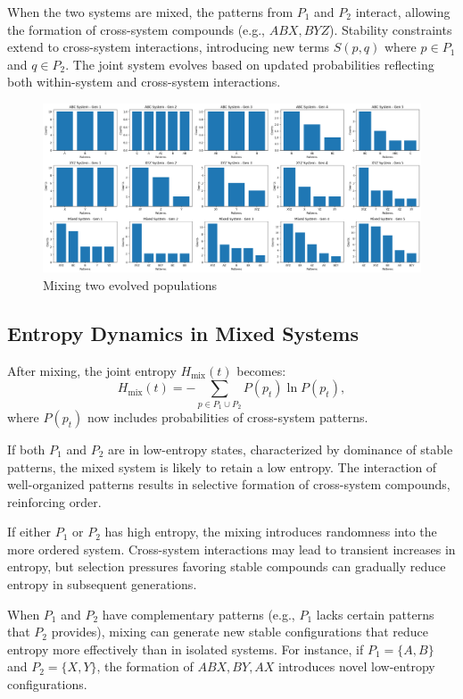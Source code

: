 \documentclass[entropy,article,submit,pdftex,moreauthors]{Definitions/mdpi}
\begin{document}
When the two systems are mixed, the patterns from \( P_1 \) and \( P_2 \) interact, allowing the formation of cross-system compounds (e.g., \( ABX, BYZ \)). Stability constraints extend to cross-system interactions, introducing new terms \( S(p, q) \) where \( p \in P_1 \) and \( q \in P_2 \). The joint system evolves based on updated probabilities reflecting both within-system and cross-system interactions.

\begin{figure}[htp]
    \centering
    \includegraphics[width=13cm]{mixed_1}
    \caption{Mixing two evolved populations}
    \label{fig:mixed_1}
\end{figure}

\subsection{Entropy Dynamics in Mixed Systems}

After mixing, the joint entropy \( H_{\text{mix}}(t) \) becomes:
\[
H_{\text{mix}}(t) = -\sum_{p \in P_1 \cup P_2} P(p_t) \ln P(p_t),
\]
where \( P(p_t) \) now includes probabilities of cross-system patterns.

If both \( P_1 \) and \( P_2 \) are in low-entropy states, characterized by dominance of stable patterns, the mixed system is likely to retain a low entropy. The interaction of well-organized patterns results in selective formation of cross-system compounds, reinforcing order.

If either \( P_1 \) or \( P_2 \) has high entropy, the mixing introduces randomness into the more ordered system. Cross-system interactions may lead to transient increases in entropy, but selection pressures favoring stable compounds can gradually reduce entropy in subsequent generations.

When \( P_1 \) and \( P_2 \) have complementary patterns (e.g., \( P_1 \) lacks certain patterns that \( P_2 \) provides), mixing can generate new stable configurations that reduce entropy more effectively than in isolated systems. For instance, if \( P_1 = \{A, B\} \) and \( P_2 = \{X, Y\} \), the formation of \( ABX, BY, AX \) introduces novel low-entropy configurations.
\end{document}
